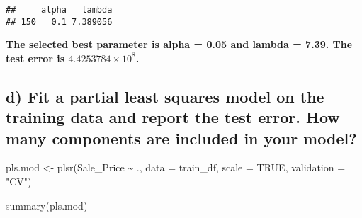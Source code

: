 \documentclass[
]{article}
\newenvironment{Shaded}{\begin{snugshade}}{\end{snugshade}}
\newcommand{\AttributeTok}[1]{\textcolor[rgb]{0.77,0.63,0.00}{#1}}
\newcommand{\CommentTok}[1]{\textcolor[rgb]{0.56,0.35,0.01}{\textit{#1}}}
\newcommand{\ConstantTok}[1]{\textcolor[rgb]{0.00,0.00,0.00}{#1}}
\newcommand{\DecValTok}[1]{\textcolor[rgb]{0.00,0.00,0.81}{#1}}
\newcommand{\FunctionTok}[1]{\textcolor[rgb]{0.00,0.00,0.00}{#1}}
\newcommand{\NormalTok}[1]{#1}
\newcommand{\OtherTok}[1]{\textcolor[rgb]{0.56,0.35,0.01}{#1}}
\newcommand{\SpecialCharTok}[1]{\textcolor[rgb]{0.00,0.00,0.00}{#1}}
\newcommand{\StringTok}[1]{\textcolor[rgb]{0.31,0.60,0.02}{#1}}
\begin{document}
\begin{verbatim}
##     alpha   lambda
## 150   0.1 7.389056
\end{verbatim}

\begin{Shaded}
\end{Shaded}

\textbf{The selected best parameter is alpha = 0.05 and lambda = 7.39.
The test error is \ensuremath{4.4253784\times 10^{8}}.}

\hypertarget{d-fit-a-partial-least-squares-model-on-the-training-data-and-report-the-test-error.-how-many-components-are-included-in-your-model}{%
\subsection{d) Fit a partial least squares model on the training data
and report the test error. How many components are included in your
model?}\label{d-fit-a-partial-least-squares-model-on-the-training-data-and-report-the-test-error.-how-many-components-are-included-in-your-model}}

\begin{Shaded}
\begin{Highlighting}[]
\NormalTok{pls.mod }\OtherTok{\textless{}{-}} \FunctionTok{plsr}\NormalTok{(Sale\_Price }\SpecialCharTok{\textasciitilde{}}\NormalTok{ ., }
                \AttributeTok{data =}\NormalTok{ train\_df, }
                \AttributeTok{scale =} \ConstantTok{TRUE}\NormalTok{,  }
                \AttributeTok{validation =} \StringTok{"CV"}\NormalTok{)}

\FunctionTok{summary}\NormalTok{(pls.mod)}
\end{Highlighting}
\end{Shaded}
\end{document}
